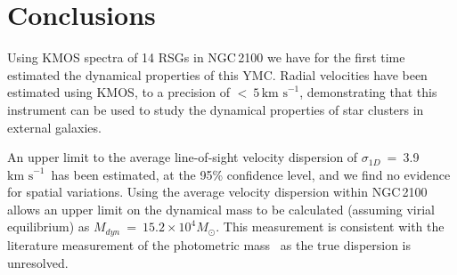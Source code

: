 \documentclass[useAMS,usenatbib]{mn2e}
\def\kms{$\mbox{km s}^{-1}$}
\begin{document}






\section{Conclusions} %
\label{sec:conclusions}

Using KMOS spectra of 14 RSGs in NGC\,2100 we have for the first time estimated the dynamical properties of this YMC.
Radial velocities have been estimated using KMOS, to a precision of $<~5$\,\kms, demonstrating that this instrument can be used to study the dynamical properties of star clusters in external galaxies.

An upper limit to the average line-of-sight velocity dispersion of $\sigma_{1D}$~=~3.9\,\kms~has been estimated, at the 95\% confidence level, and we find no evidence for spatial variations.
Using the average velocity dispersion within NGC\,2100 allows an upper limit on the dynamical mass to be calculated
(assuming virial equilibrium) as $M_{dyn}$~=~$15.2\times 10^{4}M_{\odot}$.
This measurement is consistent with the literature measurement of the photometric mass~\citep{2005ApJS..161..304M} as the true dispersion is unresolved.
\end{document}
